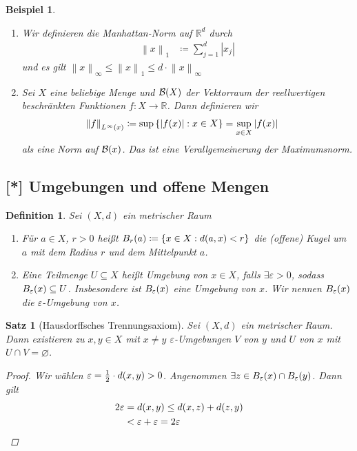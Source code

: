 \documentclass[11pt, twoside, a4paper]{article}
\theoremstyle{plain}
\newtheorem{definition}[blockelement]{Definition}
\newtheorem{satz}[blockelement]{Satz}
\newtheorem{beispiel}[blockelement]{Beispiel}
\numberwithin{equation}{subsection}
\newcommand{\set}[1]{\left\{#1\right\}}
\newcommand{\pair}[1]{\left(#1\right)}
\newcommand{\of}[1]{\mathopen{}\mathclose{}\bgroup\left(#1\aftergroup\egroup\right)}
\newcommand{\abs}[1]{\left\lvert#1\right\rvert}
\newcommand{\norm}[1]{\left\lVert#1\right\rVert}
\newcommand{\fromto}{\rightarrow{}}
\renewcommand{\emptyset}{\varnothing}
\newcommand{\R}{\mathbb{R}}
\begin{document}
\begin{beispiel}
\begin{enumerate}
            \item Wir definieren die Manhattan-Norm auf $\R^d$ durch
            \begin{align*}
                \norm{x}_1 &\coloneqq \sum_{j=1}^{d} \abs{x_j}
            \end{align*}
            und es gilt $\norm{x}_{\infty} \leq \norm{x}_1 \leq d \cdot \norm{x}_{\infty}$
            \item Sei $X$ eine beliebige Menge und $\mathcal{B}\of{X}$ der Vektorraum der reellwertigen beschränkten Funktionen $f: X\fromto \R$. Dann definieren wir
            \begin{align*}
                \norm{f}_{L^{\infty}\of{x}} &\coloneqq \sup\set{\abs{f\of{x}}: x\in X} = \sup_{x\in X} \abs{f\of{x}}
            \end{align*}
            als eine Norm auf $\mathcal{B}\of{x}$. Das ist eine Verallgemeinerung der Maximumsnorm.
        \end{enumerate}
    \end{beispiel}

    \subsection{[*] Umgebungen und offene Mengen}

    \begin{definition}
        Sei $\pair{X, d}$ ein metrischer Raum
        \begin{enumerate}[label=(\alph*)]
            \item Für $a\in X$, $r > 0$ heißt $B_r\of{a} \coloneqq \set{x\in X: d\of{a, x} < r}$ die (offene) Kugel um $a$ mit dem Radius $r$ und dem Mittelpunkt $a$.
            \item Eine Teilmenge $U\subseteq X$ heißt \emph{Umgebung} von $x\in X$, falls $\exists\varepsilon > 0$, sodass $B_{\varepsilon}\of{x} \subseteq U$. Insbesondere ist $B_{\varepsilon}\of{x}$ eine Umgebung von $x$. Wir nennen $B_{\varepsilon}\of{x}$ die $\varepsilon$-Umgebung von $x$.
        \end{enumerate}
    \end{definition}

    \begin{satz}[Hausdorffsches Trennungsaxiom]
        Sei $\pair{X, d}$ ein metrischer Raum. Dann existieren zu $x,y\in X$ mit $x\neq y$ $\varepsilon$-Umgebungen $V$ von $y$ und $U$ von $x$ mit $U\cap V = \emptyset$.
        \begin{proof}
            Wir wählen $\varepsilon = \frac{1}{2}\cdot d\of{x,y} > 0$. Angenommen $\exists z\in B_{\varepsilon}\of{x} \cap B_{\varepsilon}\of{y}$. Dann gilt
            \begin{align*}
                2\varepsilon &= d\of{x,y} \leq d\of{x,z} + d\of{z,y}\\
                &< \varepsilon + \varepsilon = 2\varepsilon\qedhere
            \end{align*}
        \end{proof}
    \end{satz}
\end{document}

